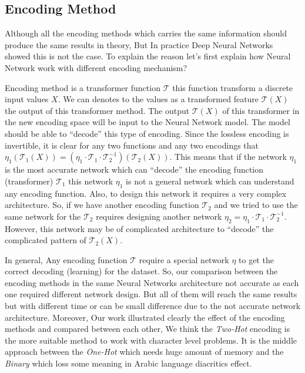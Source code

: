 \subsection{Encoding Method}

Although all the encoding methods which carries the same information should produce the same results in theory, But In practice Deep Neural Networks showed this is not the case. To explain the reason let's first explain how Neural Network work with different encoding mechanism?

Encoding method is a transformer function $\mathcal{T}$ this function transform a discrete input values $X$. We can denotes to the values as a transformed feature $\mathcal{T}(X)$ the output of this transformer method. The output $\mathcal{T}(X)$ of this transformer in the new encoding space will be input to the Neural Network model. The model should be able to ``decode''  this type of encoding. Since the lossless encoding is invertible, it is clear for any two functions and any two encodings that $\eta_1\left(\mathcal{T}_1(X)\right) = \left(\eta_1\cdot\mathcal{T}_1\cdot \mathcal{T}_2^{-1} \right)\left(\mathcal{T}_2(X)\right)$. This means that if the network $\eta_1$ is the most accurate network which can ``decode'' the encoding function (transformer) $\mathcal{T}_1$ this network $\eta_1$ is not a general network which can understand any encoding function. Also, to design this network it requires a very complex architecture. So, if we have another encoding function $\mathcal{T}_2$ and we tried to use the same network for the $\mathcal{T}_2$ requires designing another network $\eta_2 = \eta_1\cdot\mathcal{T}_1\cdot \mathcal{T}_2^{-1}$. However, this network may be of complicated architecture to ``decode'' the complicated pattern of $\mathcal{T}_2(X)$.

In general, Any encoding function $\mathcal{T}$ require a special network $\eta$ to get the correct decoding (learning) for the dataset. So, our comparison between the encoding methods in the same Neural Networks architecture not accurate as each one required different network design. But all of them will reach the same results but with different time or can be small difference due to the not accurate network architecture. Moreover, Our work illustrated clearly the effect of the encoding methods and compared between each other, We think the \textit{Two-Hot} encoding is the more suitable method to work with character level problems. It is the middle approach between the \textit{One-Hot} which needs huge amount of memory and the \textit{Binary} which loss some meaning in Arabic language diacritics effect.


